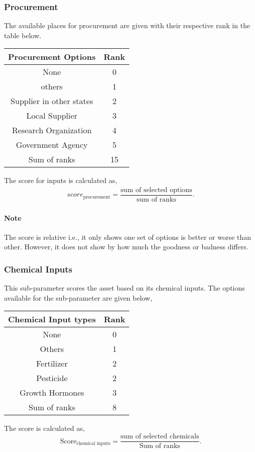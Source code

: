 \documentclass[oneside,twocolumn]{article}
\newcommand{\tsub}[2]{\text{#1}_{\text{#2}}}
\newenvironment{ttable}
               {\begin{center}
                   \begin{tabular}{c|c}
                     \hline
               }
               {\end{tabular}
                 \end{center}
               }
\begin{document}
\subsubsection{Procurement}
The available places for procurement are given with their
respective rank in the table below.
\begin{center}
  \begin{tabular}{c | c}
    \hline
    Procurement Options & Rank \\ \hline
    None & 0 \\
    others & 1 \\
    Supplier in other states & 2 \\
    Local Supplier & 3 \\
    Research Organization & 4 \\
    Government Agency & 5 \\ \hline
    Sum of ranks & 15 \\ \hline
  \end{tabular}
\end{center}
The score for inputs is calculated as,
\begin{align*}
  score_{\text{procurement}} = \dfrac{\text{sum of selected options}}{\text{sum of ranks}}.
\end{align*}

\paragraph{Note}
The score is relative i.e., it only shows one set of options is better or
worse than other. However, it does not show by how much the goodness or badness differs.

\subsubsection{Chemical Inputs}
This sub-parameter scores the asset based on its chemical inputs. The options available for the sub-parameter are given below,
\begin{ttable}
  Chemical Input types & Rank \\ \hline
  None & 0 \\
  Others & 1 \\
  Fertilizer & 2 \\
  Pesticide & 2 \\
  Growth Hormones & 3 \\ \hline
  Sum of ranks & 8 \\ \hline
\end{ttable}
The score is calculated as,
\[
\tsub{Score}{chemical inputs} = \dfrac{\text{sum of selected chemicals}}{\text{Sum of ranks}}.
\]
\end{document}
